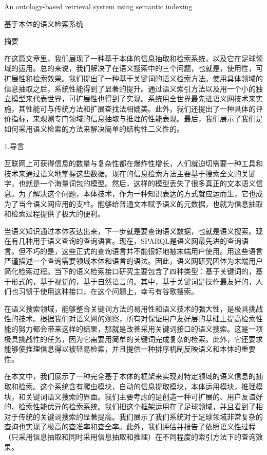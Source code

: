 \begin{center}
An ontology-based retrieval system using semantic indexing

基于本体的语义检索系统
\end{center}
\renewcommand{\thetable}{\arabic{table}}
\renewcommand{\thefigure}{\arabic{figure}}
\setcounter{figure}{0}
\setcounter{table}{0}
\xiaosihao
\setlength\parindent{2em}
\setlength{\baselineskip}{20pt} %
\renewcommand\refname{参考文献}

摘要

在这篇文章里，我们展现了一种基于本体的信息抽取和检索系统，以及它在足球领域的运用。总的来说，我们解决了在语义搜索中的三个问题，也就是，使用性，可扩展性和检索效果。我们提出了一种基于关键词的语义检索方法。使用具体领域的信息抽取之后，系统性能得到了显著的提升。通过语义索引方法以及用一个小的独立模型来代表世界，可扩展性也得到了实现。系统用全世界最先进语义网技术来实施，其性能可与传统方法和扩展查找法相媲美。此外，我们还提出了一种具体的评价指标，来观测专门领域的信息抽取与推理的性能表现。最后，我们展示了我们是如何采用语义检索的方法来解决简单的结构性二义性的。

1.导言

互联网上可获得信息的数量与复杂性都在爆炸性增长，人们就迫切需要一种工具和技术来通过语义地掌握这些数据。现在的信息检索方法主要基于搜索全文的关键字，也就是一个海量词包的模型。然后，这样的模型丢失了很多真正的文本语义信息。为了解决这个问题，本体技术，作为一种知识表达的方式就应运而生，它也成为了当今语义网应用的支柱。能够给普通文本赋予语义的元数据，也就为信息抽取和检索过程提供了极大的便利。

当语义知识通过本体表达出来，下一步就是要查询语义数据，也就是语义搜索。现在有几种用于语义查询的查询语言。现在，{\Times SPARQL}是语义网最先进的查询语言。但不巧的是，这些正式的查询语言并不能很好地被末端用户使用。用这些语言严谨描述一个查询需要领域本体和语言的语法。因此，语义网研究团体为末端用户简化检索过程。当下的语义检索接口研究主要包含了四种类型：基于关键词的，基于形式的，基于视觉的，基于自然语言的。其中，基于关键词是操作最友好的，人们也习惯于使用这种接口，在这个问题上，幸亏有谷歌搜索。

在语义搜索领域，能够整合关键词方法的易用性和语义技术的强大性，是极具挑战性的技术。根据我们对语义网的观察，所有对保证用户友好层的基础上提高检索性能的努力都会带来这样的结果，那就是改善采用关键词接口的语义搜索。这是一项极具挑战性的任务，因为它需要用简单的关键词完成复杂的检索。此外，它还要求能够使推理信息得以被轻易检索，并且提供一种排序机制反映语义和本体的重要性。

在本文中，我们展示了一种完全基于本体的框架来实现对特定领域的语义信息的抽取和检索。这个系统含有爬虫模块，自动的信息提取模块，本体运用模块，推理模块，和关键词语义搜索的界面。我们主要考虑的是创造一种可扩展的、用户友谊好的、检索性能优异的检索系统。我们把这个框架运用在了足球领域，并且看到了相对于传统的关键词搜索的显著提高。我们展示了我们系统对于足球领域非常复杂的查询也实现了极高的查准率和查全率。此外，我们评估并报告了依照语义性过程（只采用信息抽取和同时采用信息抽取和推理）在不同程度的索引方法下的查询效果。

